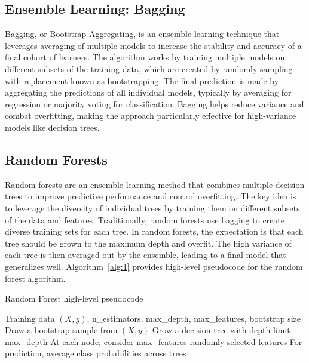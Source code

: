 \documentclass[conference]{IEEEtran}
\begin{document}
\subsection{Ensemble Learning: Bagging}
Bagging, or Bootstrap Aggregating, is an ensemble learning technique that leverages averaging of multiple models to increase the stability and accuracy of a final cohort of learners. The algorithm works by training multiple models on different subsets of the training data, which are created by randomly sampling with 
 replacement known as bootstrapping. The final prediction is made by aggregating the predictions of all individual models, typically by 
 averaging for regression or majority voting for classification. Bagging helps reduce variance and combat overfitting, making the approach 
 particularly effective for high-variance models like decision trees.

\subsection{Random Forests}

Random forests are an ensemble learning method that combines multiple decision trees to improve predictive performance and control overfitting. The key idea is to leverage the diversity of individual trees by training them on different subsets of the data and features. Traditionally, random forests use bagging to create diverse training sets for each tree. In random forests, the expectation is that each tree should be grown to the maximum depth and overfit. The high variance of each tree is then averaged out by the ensemble, leading to a final model that generalizes well.
Algorithm~\ref{alg:1} provides high-level pseudocode for the random forest algorithm.
\begin{algorithm}[H]
\caption{Random Forest high-level pseudocode}
\begin{algorithmic}[1]
\REQUIRE Training data $(X, y)$, n\_estimators, max\_depth, max\_features, bootstrap size
  \STATE Draw a bootstrap sample from $(X, y)$  %
  \STATE Grow a decision tree with depth limit max\_depth
  \STATE At each node, consider max\_features randomly selected features
\ENDFOR
\STATE For prediction, average class probabilities across trees
\end{algorithmic}
\label{alg:1}
\end{algorithm}
\end{document}
